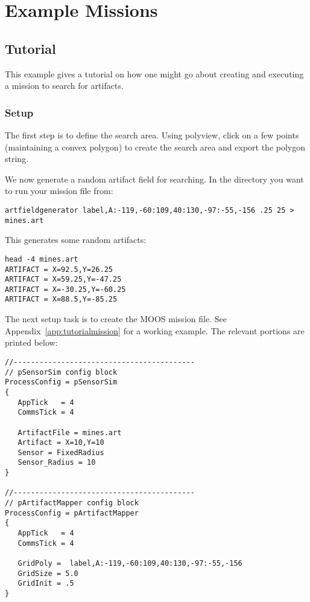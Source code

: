 \section{Example Missions}
\label{examples}

\subsection{Tutorial}
\label{ex:tutorial}
This example gives a tutorial on how one might go about creating and executing a mission to search for artifacts.

\subsubsection{Setup}
\label{ex:tutorial:setup}
The first step is to define the search area.  Using polyview, click on a few points (maintaining a convex polygon) to create the search area and export the polygon string.


We now generate a random artifact field for searching.  In the directory you want to run your mission file from:

{\tt artfieldgenerator label,A:-119,-60:109,40:130,-97:-55,-156 .25 25 > mines.art}

This generates some random artifacts:

\begin{verbatim}
head -4 mines.art 
ARTIFACT = X=92.5,Y=26.25
ARTIFACT = X=59.25,Y=-47.25
ARTIFACT = X=-30.25,Y=-60.25
ARTIFACT = X=88.5,Y=-85.25
\end{verbatim}

The next setup task is to create the MOOS mission file.  See Appendix~\ref{app:tutorialmission} for a working example.  The relevant portions are printed below:
\begin{verbatim}
//------------------------------------------
// pSensorSim config block
ProcessConfig = pSensorSim
{
   AppTick   = 4
   CommsTick = 4
   
   ArtifactFile = mines.art
   Artifact = X=10,Y=10
   Sensor = FixedRadius
   Sensor_Radius = 10   
}

//------------------------------------------
// pArtifactMapper config block
ProcessConfig = pArtifactMapper
{
   AppTick   = 4
   CommsTick = 4
   
   GridPoly =  label,A:-119,-60:109,40:130,-97:-55,-156
   GridSize = 5.0
   GridInit = .5
}
\end{verbatim}

